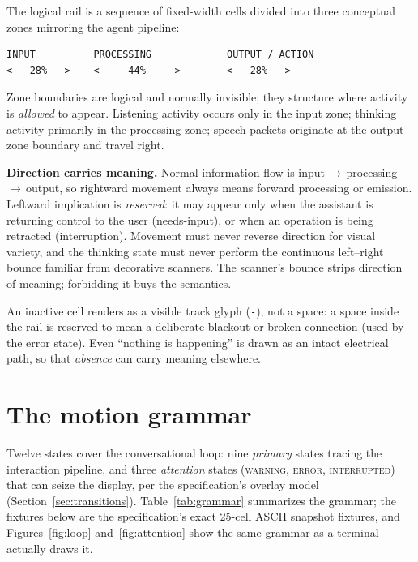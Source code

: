 \documentclass[11pt]{article}
\newcommand{\railstate}[1]{\textsc{#1}}
\begin{document}
The logical rail is a sequence of fixed-width cells divided into three
conceptual zones mirroring the agent pipeline:

\begin{lstlisting}
INPUT          PROCESSING             OUTPUT / ACTION
<-- 28% -->    <---- 44% ---->        <-- 28% -->
\end{lstlisting}

Zone boundaries are logical and normally invisible; they structure where
activity is \emph{allowed} to appear. Listening activity occurs only in
the input zone; thinking activity primarily in the processing zone;
speech packets originate at the output-zone boundary and travel right.

\textbf{Direction carries meaning.} Normal information flow is
input\,$\rightarrow$\,processing\,$\rightarrow$\,output, so rightward
movement always means forward processing or emission. Leftward implication
is \emph{reserved}: it may appear only when the assistant is returning
control to the user (needs-input), or when an operation is being retracted
(interruption). Movement must never reverse direction for visual variety,
and the thinking state must never perform the continuous left--right
bounce familiar from decorative scanners. The scanner's bounce strips direction of meaning; forbidding it buys the semantics.

An inactive cell renders as a visible track glyph (\texttt{-}), not a
space: a space inside the rail is reserved to mean a deliberate blackout
or broken connection (used by the error state). Even ``nothing is
happening'' is drawn as an intact electrical path, so that \emph{absence}
can carry meaning elsewhere.

\section{The motion grammar}
\label{sec:grammar}

Twelve states cover the conversational loop: nine \emph{primary} states
tracing the interaction pipeline, and three \emph{attention} states
(\railstate{warning}, \railstate{error}, \railstate{interrupted}) that
can seize the display, per the specification's overlay model
(Section~\ref{sec:transitions}). Table~\ref{tab:grammar} summarizes the
grammar; the fixtures below are the specification's exact 25-cell ASCII
snapshot fixtures, and Figures~\ref{fig:loop} and~\ref{fig:attention}
show the same grammar as a terminal actually draws it.
\end{document}
